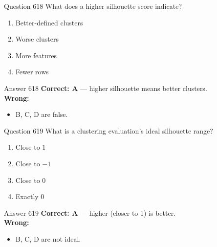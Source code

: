 \documentclass[aspectratio=169,11pt]{beamer}
\begin{document}
	\begin{frame}{Question 618}
		What does a higher silhouette score indicate?
		\begin{enumerate}[label=\Alph*.]
			\item Better-defined clusters
			\item Worse clusters
			\item More features
			\item Fewer rows
		\end{enumerate}
	\end{frame}
	\begin{frame}{Answer 618}
		\textbf{Correct: A} --- higher silhouette means better clusters.\\
		\vspace{0.5em}
		\textbf{Wrong:}
		\begin{itemize}
			\item B, C, D are false.
		\end{itemize}
	\end{frame}
	
	\begin{frame}{Question 619}
		What is a clustering evaluation's ideal silhouette range?
		\begin{enumerate}[label=\Alph*.]
			\item Close to 1
			\item Close to $-1$
			\item Close to 0
			\item Exactly 0
		\end{enumerate}
	\end{frame}
	\begin{frame}{Answer 619}
		\textbf{Correct: A} --- higher (closer to 1) is better.\\
		\vspace{0.5em}
		\textbf{Wrong:}
		\begin{itemize}
			\item B, C, D are not ideal.
		\end{itemize}
	\end{frame}
	
\end{document}
